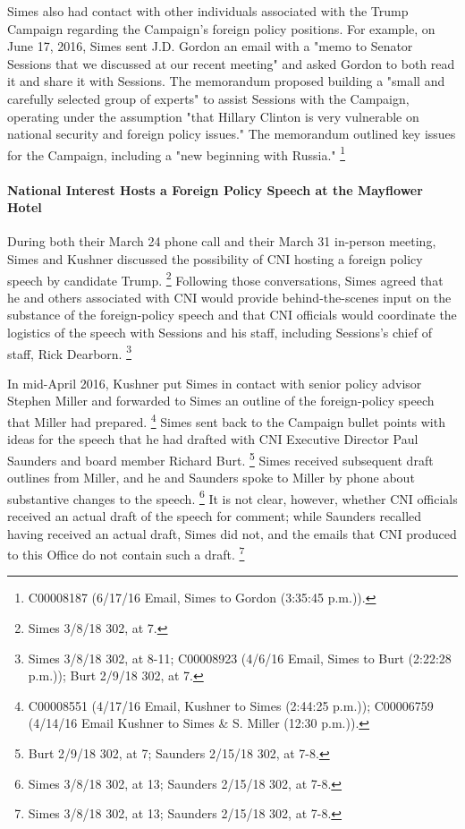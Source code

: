 Simes also had contact with other individuals associated with the Trump Campaign regarding the Campaign's foreign policy positions.
For example, on June 17, 2016, Simes sent J.D. Gordon an email with a "memo to Senator Sessions that we discussed at our recent meeting" and asked Gordon to both read it and share it with Sessions.
The memorandum proposed building a "small and carefully selected group of experts" to assist Sessions with the Campaign, operating under the assumption "that Hillary Clinton is very vulnerable on national security and foreign policy issues."
The memorandum outlined key issues for the Campaign, including a "new beginning with Russia."%
\footnote{C00008187 (6/17/16 Email, Simes to Gordon (3:35:45 p.m.)).}

\paragraph{National Interest Hosts a Foreign Policy Speech at the Mayflower Hotel}

During both their March 24 phone call and their March 31 in-person meeting, Simes and Kushner discussed the possibility of CNI hosting a foreign policy speech by candidate Trump.%
\footnote{Simes 3/8/18 302, at 7.}
Following those conversations, Simes agreed that he and others associated with CNI would provide behind-the-scenes input on the substance of the foreign-policy speech and that CNI officials would coordinate the logistics of the speech with Sessions and his staff, including Sessions's chief of staff, Rick Dearborn.%
\footnote{Simes 3/8/18 302, at 8-11; 
C00008923 (4/6/16 Email, Simes to Burt (2:22:28 p.m.)); 
Burt 2/9/18 302, at 7.}

In mid-April 2016, Kushner put Simes in contact with senior policy advisor Stephen Miller and forwarded to Simes an outline of the foreign-policy speech that Miller had prepared.%
\footnote{C00008551 (4/17/16 Email, Kushner to Simes (2:44:25 p.m.)); 
C00006759 (4/14/16 Email Kushner to Simes \& S. Miller (12:30 p.m.)).}
Simes sent back to the Campaign bullet points with ideas for the speech that he had drafted with CNI Executive Director Paul Saunders and board member Richard Burt.%
\footnote{Burt 2/9/18 302, at 7; 
Saunders 2/15/18 302, at 7-8.}
Simes received subsequent draft outlines from Miller, and he and Saunders spoke to Miller by phone about substantive changes to the speech.%
\footnote{Simes 3/8/18 302, at 13; 
Saunders 2/15/18 302, at 7-8.}
It is not clear, however, whether CNI officials received an actual draft of the speech for comment; while Saunders recalled having received an actual draft, Simes did not, and the emails that CNI produced to this Office do not contain such a draft.%
\footnote{Simes 3/8/18 302, at 13; 
Saunders 2/15/18 302, at 7-8.}

